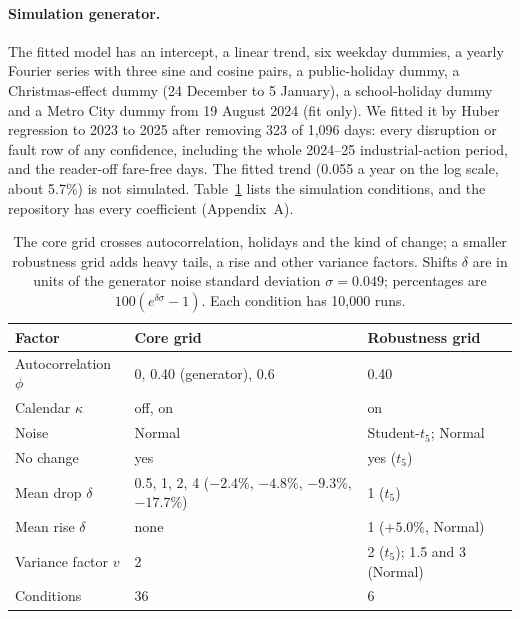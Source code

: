 \paragraph{Simulation generator.} The fitted model has an intercept, a linear trend, six weekday dummies, a yearly Fourier series with three sine and cosine pairs, a public-holiday dummy, a Christmas-effect dummy (24 December to 5 January), a school-holiday dummy and a Metro City dummy from 19 August 2024 (fit only). We fitted it by Huber regression to 2023 to 2025 after removing 323 of 1,096 days: every disruption or fault row of any confidence, including the whole 2024--25 industrial-action period, and the reader-off fare-free days. The fitted trend (0.055 a year on the log scale, about 5.7\%) is not simulated. Table~\ref{tab:simconditions} lists the simulation conditions, and the repository has every coefficient (Appendix~A).

\begin{table}[t]
\centering
\caption{The core grid crosses autocorrelation, holidays and the kind of change; a smaller robustness grid adds heavy tails, a rise and other variance factors. Shifts $\delta$ are in units of the generator noise standard deviation $\sigma = 0.049$; percentages are $100(e^{\delta\sigma}-1)$. Each condition has 10,000 runs.}
\label{tab:simconditions}
\begin{tabular}{@{}p{2.9cm}p{6.6cm}p{5.6cm}@{}}
\toprule
Factor & Core grid & Robustness grid \\
\midrule
Autocorrelation $\phi$ & 0, 0.40 (generator), 0.6 & 0.40 \\
Calendar $\kappa$ & off, on & on \\
Noise & Normal & Student-$t_5$; Normal \\
No change & yes & yes ($t_5$) \\
Mean drop $\delta$ & 0.5, 1, 2, 4 ($-2.4\%$, $-4.8\%$, $-9.3\%$, $-17.7\%$) & 1 ($t_5$) \\
Mean rise $\delta$ & none & 1 ($+5.0\%$, Normal) \\
Variance factor $v$ & 2 & 2 ($t_5$); 1.5 and 3 (Normal) \\
\midrule
Conditions & 36 & 6 \\
\bottomrule
\end{tabular}
\end{table}

